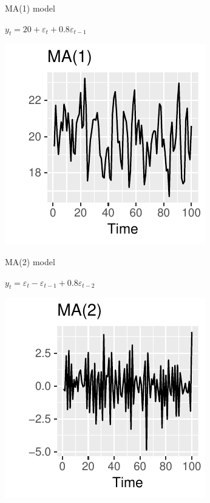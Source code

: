 \documentclass[14pt,ignorenonframetext,]{beamer}
\begin{document}
\begin{frame}{MA(1) model}

\begin{block}{}
\centerline{$y_t = 20 + \varepsilon_t + 0.8 \varepsilon_{t-1}$}
\end{block}


\includegraphics[width=0.5\linewidth]{week_5_arima_files/figure-beamer/unnamed-chunk-22-1}

\end{frame}

\begin{frame}{MA(2) model}

\begin{block}{}
\centerline{$y_t = \varepsilon_t -\varepsilon_{t-1} + 0.8 \varepsilon_{t-2}$}
\end{block}


\includegraphics[width=0.5\linewidth]{week_5_arima_files/figure-beamer/unnamed-chunk-23-1}

\end{frame}
\end{document}
